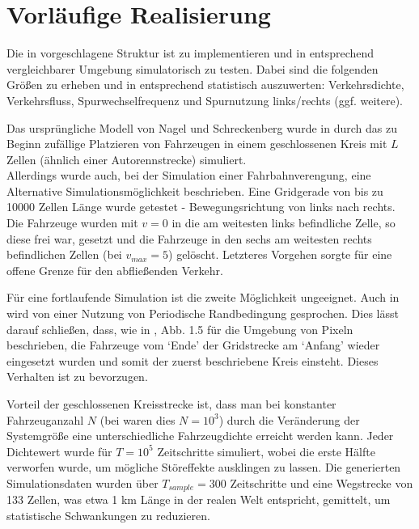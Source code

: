 \section{Vorläufige Realisierung}
\label{sec:realisierung}


Die in \cite{dat-ba} vorgeschlagene Struktur ist zu implementieren und in entsprechend vergleichbarer Umgebung simulatorisch zu testen. Dabei sind die folgenden Größen zu erheben und in entsprechend statistisch auszuwerten: Verkehrsdichte, Verkehrsfluss, Spurwechselfrequenz und Spurnutzung links/rechts (ggf. weitere).

Das ursprüngliche Modell von Nagel und Schreckenberg wurde in \cite{na-sch} durch das zu Beginn zufällige Platzieren von Fahrzeugen in einem geschlossenen Kreis mit $L$ Zellen (ähnlich einer Autorennstrecke) simuliert. \\
Allerdings wurde auch, bei der Simulation einer Fahrbahnverengung, eine Alternative Simulationsmöglichkeit beschrieben. 
Eine Gridgerade von bis zu 10000 Zellen Länge wurde getestet - Bewegungsrichtung von links nach rechts. 
Die Fahrzeuge wurden mit $v=0$ in die am weitesten links befindliche Zelle, so diese frei war, gesetzt und die Fahrzeuge in den sechs am weitesten rechts befindlichen Zellen (bei $v_{max}=5$) gelöscht. 
Letzteres Vorgehen sorgte für eine offene Grenze für den abfließenden Verkehr.

Für eine fortlaufende Simulation ist die zweite Möglichkeit ungeeignet. Auch in \cite{multi-lane} wird von einer Nutzung von Periodische Randbedingung gesprochen. 
Dies lässt darauf schließen, dass, wie in \cite{peri-rand}, Abb. 1.5 für die Umgebung von Pixeln beschrieben, die Fahrzeuge vom \enquote*{Ende} der Gridstrecke am \enquote*{Anfang} wieder eingesetzt wurden und somit der zuerst beschriebene Kreis einsteht.
Dieses Verhalten ist zu bevorzugen.

Vorteil der geschlossenen Kreisstrecke ist, dass man bei konstanter Fahrzeuganzahl $N$ (bei \cite{multi-lane} waren dies $N = 10^{3}$) durch die Veränderung der Systemgröße eine unterschiedliche Fahrzeugdichte erreicht werden kann. 
Jeder Dichtewert wurde für $T = 10^{5}$ Zeitschritte simuliert, wobei die erste Hälfte verworfen wurde, um mögliche Störeffekte ausklingen zu lassen. 
Die generierten Simulationsdaten wurden über $T_{sample} = 300$ Zeitschritte und eine Wegstrecke von 133 Zellen, was etwa 1 km Länge in der realen Welt entspricht, gemittelt, um statistische Schwankungen zu reduzieren.


